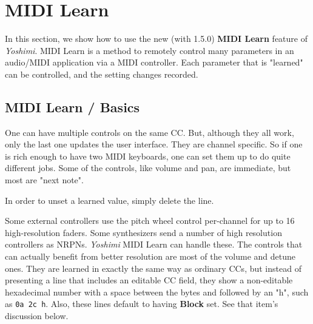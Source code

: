 %
%
%

\section{MIDI Learn}
\label{sec:midi_learn}

   In this section, we show how to use the new (with 1.5.0)
   \textbf{MIDI Learn} feature of \textsl{Yoshimi}.
   MIDI Learn is a method to remotely control many parameters in an audio/MIDI
   application via a MIDI controller.  Each parameter that is "learned" can be
   controlled, and the setting changes recorded.

\subsection{MIDI Learn / Basics}
\label{subsec:midi_learn_basics}


   One can have multiple controls on the same CC.  But, although they all work,
   only the last one updates the user interface.  They are channel specific. So
   if one is rich enough to have two MIDI keyboards, one can set them up to do
   quite different jobs.
   Some of the controls, like volume and pan, are immediate, but most are "next
   note".

   In order to unset a learned value, simply delete the line.

   Some external controllers use the pitch wheel control per-channel for up to 16
   high-resolution faders.
   Some synthesizers send a number of high resolution controllers as NRPNs.
   \textsl{Yoshimi} MIDI Learn can handle these.
   The controls that can actually benefit from better resolution are
   most of the volume and detune ones.
   They are learned in exactly the same way as ordinary CCs, but instead of
   presenting a line that includes an editable CC field, they show a non-editable
   hexadecimal number with a space between the bytes and followed by an "h",
   such as \texttt{0a 2c h}.
   Also, these lines default to having \textbf{Block} set.
   See that item's discussion below.


